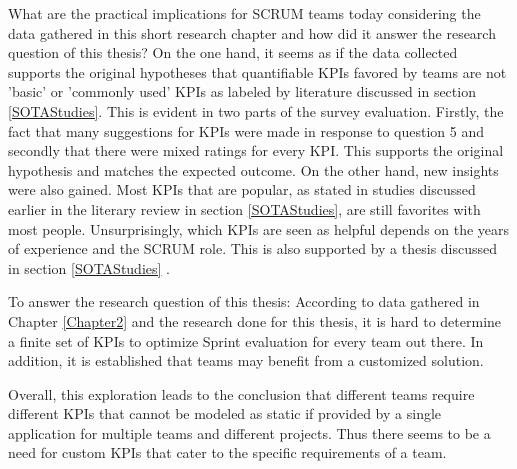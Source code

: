 What are the practical implications for SCRUM teams today considering the data gathered in this short research chapter and how did it answer the research question of this thesis? 
On the one hand, it seems as if the data collected supports the original hypotheses that quantifiable KPIs 
favored by teams are not 'basic' or 'commonly used' KPIs as labeled by literature discussed in section \ref{SOTAStudies}.
This is evident in two parts of the survey evaluation. 
Firstly, the fact that many suggestions for KPIs were made in response to question 5 and secondly that there were mixed ratings
for every KPI. This supports the original hypothesis and matches the expected outcome.
On the other hand, new insights were also gained. 
Most KPIs that are popular, as stated in studies discussed earlier in the literary review in section \ref{SOTAStudies}, 
are still favorites with most people. 
Unsurprisingly, which KPIs are seen as helpful depends on the years of experience and the SCRUM role. This is also supported by
a thesis discussed in section \ref{SOTAStudies} \parencite{AgileProjectHealthIndicatorsThesis}.

To answer the research question of this thesis: According to data gathered in Chapter \ref{Chapter2} and the research done for this thesis, it is hard to determine a finite set of KPIs to optimize Sprint evaluation for every team out there.
In addition, it is established that teams may benefit from a customized solution. 

Overall, this exploration leads to the conclusion that different teams require different KPIs that cannot be modeled as static
if provided by a single application for multiple teams and different projects. 
Thus there seems to be a need for custom KPIs that cater to the specific requirements of a team.  